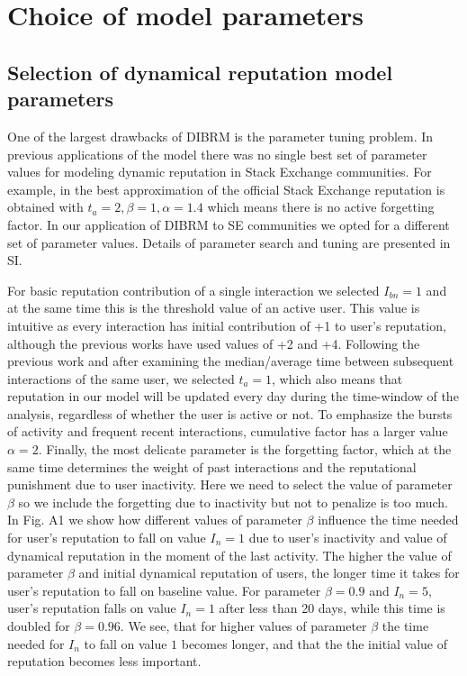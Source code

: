 \chapter{Choice of model parameters}

\section{Selection of dynamical reputation model parameters}

One of the largest drawbacks of DIBRM is the parameter tuning problem. In previous applications of the model \cite{melnikovDynamicInteractionBasedReputation2018,yashkina2020} there was no single best set of parameter values for modeling dynamic reputation in Stack Exchange communities. For example, in \cite{yashkina2020} the best approximation of the official Stack Exchange reputation is obtained with $t_a =2, \beta = 1, \alpha = 1.4$ which means there is no active forgetting factor. In our application of DIBRM to SE communities we opted for a different set of parameter values. Details of parameter search and tuning are presented in SI.

For basic reputation contribution of a single interaction we selected $I_{bn} = 1$ and at the same time this is the threshold value of an active user. This value is intuitive as every interaction has initial contribution of +1 to user's reputation, although the previous works have used values of +2 and +4. Following the previous work and after examining the median/average time between subsequent interactions of the same user, we selected $t_a = 1$, which also means that reputation in our model will be updated every day during the time-window of the analysis, regardless of whether the user is active or not. To emphasize the bursts of activity and frequent recent interactions, cumulative factor has a larger value $\alpha = 2$. Finally, the most delicate parameter is the forgetting factor, which at the same time determines the weight of past interactions and the reputational punishment due to user inactivity. Here we need to select the value of parameter $\beta$ so we include the forgetting due to inactivity but not to penalize is too much. In Fig. A1 we show how different values of parameter $\beta$ influence the time needed for user's reputation to fall on value $I_{n}=1$ due to user's inactivity and value of dynamical reputation in the moment of the last activity. The higher the value of parameter $\beta$ and initial dynamical reputation of users, the longer time it takes for user's reputation to fall on baseline value. For parameter $\beta=0.9$ and $I_{n}=5$, user's reputation falls on value $I_{n}=1$ after less than 20 days, while this time is doubled for $\beta=0.96$. We see, that for higher values of parameter $\beta$ the time needed for $I_{n}$ to fall on value $1$ becomes longer, and that the the initial value of reputation becomes less important. 

